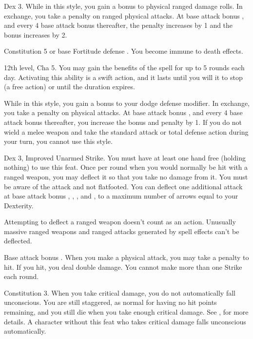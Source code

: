  Dex 3.
 While in this style, you gain a  bonus to physical ranged damage rolls. In exchange, you take a  penalty on ranged physical attacks. At base attack bonus , and every 4 base attack bonus thereafter, the penalty increases by 1 and the bonus increases by 2.

\featpre Constitution 5 or base Fortitude defense .
\featben You become immune to death effects.

\featpre 12th level, Cha 5.
\featben You may gain the benefits of the  spell for up to 5 rounds each day. Activating this ability is a swift action, and it lasts until you will it to stop (a free action) or until the duration expires.

 While in this style, you gain a  bonus to your dodge defense modifier. In exchange, you take a  penalty on physical attacks. At base attack bonus , and every 4 base attack bonus thereafter, you increase the bonus and penalty by 1. If you do not wield a melee weapon and take the standard attack or total defense action during your turn, you cannot use this style.

 Dex 3, Improved Unarmed Strike.
 You must have at least one hand free (holding nothing) to use this feat. Once per round when you would normally be hit with a ranged weapon, you may deflect it so that you take no damage from it. You must be aware of the attack and not flatfooted. You can deflect one additional attack at base attack bonus , , , and , to a maximum number of arrows equal to your Dexterity.
\par Attempting to deflect a ranged weapon doesn't count as an action. Unusually massive ranged weapons and ranged attacks generated by spell effects can't be deflected.

\featpre Base attack bonus .
\featben When you make a physical attack, you may take a  penalty to hit. If you hit, you deal double damage. You cannot make more than one Strike each round.

 Constitution 3.
 When you take critical damage, you do not automatically fall unconscious. You are still staggered, as normal for having no hit points remaining, and you still die when you take enough critical damage. See , for more details.
 A character without this feat who takes critical damage falls unconscious automatically.

